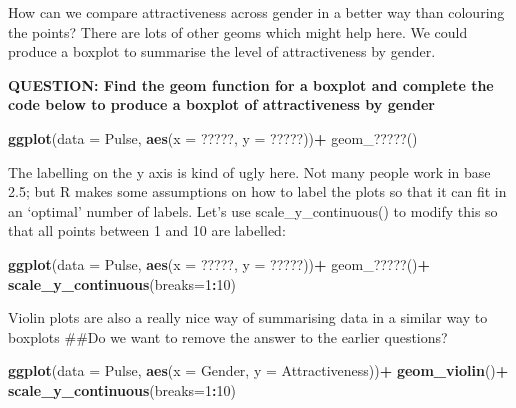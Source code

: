 \documentclass[]{book}
\newenvironment{Shaded}{\begin{snugshade}}{\end{snugshade}}
\newcommand{\DataTypeTok}[1]{\textcolor[rgb]{0.13,0.29,0.53}{#1}}
\newcommand{\DecValTok}[1]{\textcolor[rgb]{0.00,0.00,0.81}{#1}}
\newcommand{\KeywordTok}[1]{\textcolor[rgb]{0.13,0.29,0.53}{\textbf{#1}}}
\newcommand{\NormalTok}[1]{#1}
\newcommand{\OperatorTok}[1]{\textcolor[rgb]{0.81,0.36,0.00}{\textbf{#1}}}
\newcommand{\StringTok}[1]{\textcolor[rgb]{0.31,0.60,0.02}{#1}}
\begin{document}
How can we compare attractiveness across gender in a better way than colouring the points? There are lots of other geoms which might help here. We could produce a boxplot to summarise the level of attractiveness by gender.

\textbf{QUESTION: Find the geom function for a boxplot and complete the code below to produce a boxplot of attractiveness by gender}

\begin{Shaded}
\begin{Highlighting}[]
\KeywordTok{ggplot}\NormalTok{(}\DataTypeTok{data =}\NormalTok{ Pulse,  }\KeywordTok{aes}\NormalTok{(}\DataTypeTok{x =}\NormalTok{ ?????, }\DataTypeTok{y =}\NormalTok{ ?????))}\OperatorTok{+}
\StringTok{  }\NormalTok{geom_?????()}
\end{Highlighting}
\end{Shaded}

The labelling on the y axis is kind of ugly here. Not many people work in base 2.5; but R makes some assumptions on how to label the plots so that it can fit in an `optimal' number of labels. Let's use scale\_y\_continuous() to modify this so that all points between 1 and 10 are labelled:

\begin{Shaded}
\begin{Highlighting}[]
\KeywordTok{ggplot}\NormalTok{(}\DataTypeTok{data =}\NormalTok{ Pulse,  }\KeywordTok{aes}\NormalTok{(}\DataTypeTok{x =}\NormalTok{ ?????, }\DataTypeTok{y =}\NormalTok{ ?????))}\OperatorTok{+}
\StringTok{  }\NormalTok{geom_?????()}\OperatorTok{+}
\StringTok{    }\KeywordTok{scale_y_continuous}\NormalTok{(}\DataTypeTok{breaks=}\DecValTok{1}\OperatorTok{:}\DecValTok{10}\NormalTok{)}
\end{Highlighting}
\end{Shaded}

Violin plots are also a really nice way of summarising data in a similar way to boxplots
\#\#Do we want to remove the answer to the earlier questions?

\begin{Shaded}
\begin{Highlighting}[]
\KeywordTok{ggplot}\NormalTok{(}\DataTypeTok{data =}\NormalTok{ Pulse,  }\KeywordTok{aes}\NormalTok{(}\DataTypeTok{x =}\NormalTok{ Gender, }\DataTypeTok{y =}\NormalTok{ Attractiveness))}\OperatorTok{+}
\StringTok{  }\KeywordTok{geom_violin}\NormalTok{()}\OperatorTok{+}
\StringTok{    }\KeywordTok{scale_y_continuous}\NormalTok{(}\DataTypeTok{breaks=}\DecValTok{1}\OperatorTok{:}\DecValTok{10}\NormalTok{)}
\end{Highlighting}
\end{Shaded}
\end{document}
